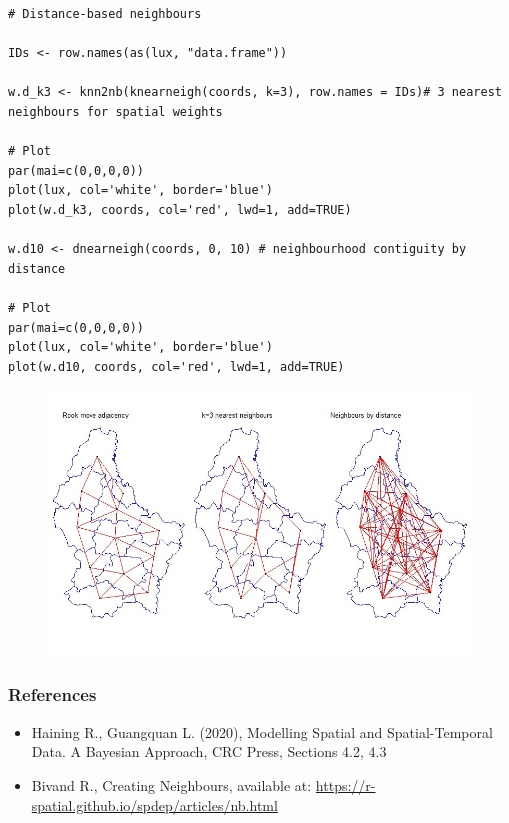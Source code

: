 \documentclass[12pt]{beamer}
\begin{document}
\begin{frame} [fragile]
\begin{tiny}
\begin{verbatim}
# Distance-based neighbours

IDs <- row.names(as(lux, "data.frame"))

w.d_k3 <- knn2nb(knearneigh(coords, k=3), row.names = IDs)# 3 nearest neighbours for spatial weights

# Plot
par(mai=c(0,0,0,0))
plot(lux, col='white', border='blue')
plot(w.d_k3, coords, col='red', lwd=1, add=TRUE)

w.d10 <- dnearneigh(coords, 0, 10) # neighbourhood contiguity by distance

# Plot
par(mai=c(0,0,0,0))
plot(lux, col='white', border='blue')
plot(w.d10, coords, col='red', lwd=1, add=TRUE)
\end{verbatim}
\end{tiny}
\vspace{-7pt}
\begin{figure}
\includegraphics[scale=0.53]{Lux_neigh3.jpg}
\end{figure}
\end{frame}

\begin{frame}
\frametitle{References}
\begin{itemize}
\item Haining R., Guangquan L. (2020), Modelling Spatial and Spatial-Temporal Data. A Bayesian Approach, CRC Press, Sections 4.2, 4.3
\item Bivand R., Creating Neighbours, available at: \url{https://r-spatial.github.io/spdep/articles/nb.html}
\end{itemize}
\end{frame}
\end{document}

